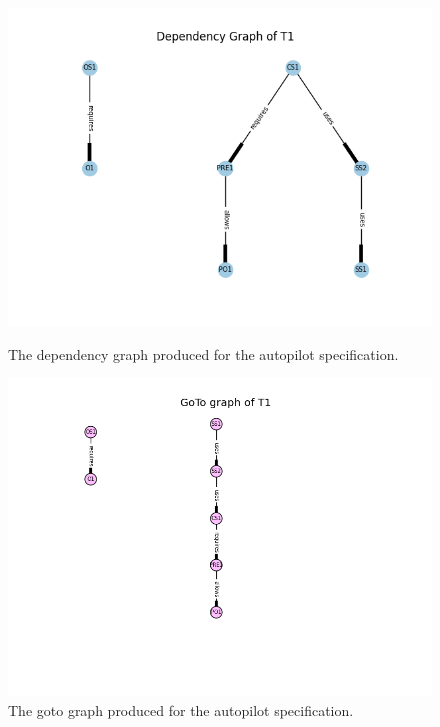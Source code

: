 \begin{figure}[H]
\centering
\begin{minipage}{0.45\textwidth}
\centering
\includegraphics[scale=0.5]{Figures/Evaluation/semiform25a.png}
\vspace{-0.18in}
\caption{The dependency graph produced for the autopilot specification. \label{fig:autodepgraph}}
\vspace{-0.2in}
\end{minipage}\hfill
\begin{minipage}{0.43\textwidth}
\centering
\includegraphics[scale=0.5]{examples/semiform/25b.png}
\vspace{-0.2in}
\caption{The goto graph produced for the autopilot specification. \label{fig:autogotograph}}
\vspace{-0.2in}
\end{minipage}
\end{figure}

